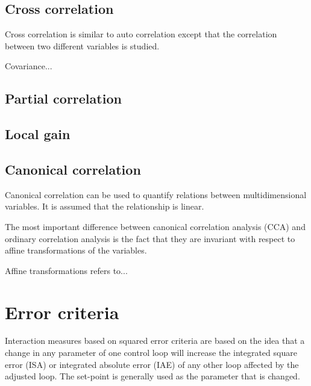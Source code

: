 \documentclass[a4paper]{book}
\begin{document}
\subsection{Cross correlation}

Cross correlation is similar to auto correlation except that the correlation between two different variables is studied.

Covariance...

\subsection{Partial correlation}


\subsection{Local gain}



\subsection{Canonical correlation}

Canonical correlation can be used to quantify relations between multidimensional variables.
It is assumed that the relationship is linear.


The most important difference between canonical correlation analysis (CCA) and ordinary correlation analysis is the fact that they are invariant with respect to affine transformations of the variables.

Affine transformations refers to... %

\section{Error criteria}

Interaction measures based on squared error criteria are based on the idea that a change in any parameter of one control loop will increase the integrated square error (ISA) or integrated absolute error (IAE) of any other loop affected by the adjusted loop.
The set-point is generally used as the parameter that is changed.
\end{document}
